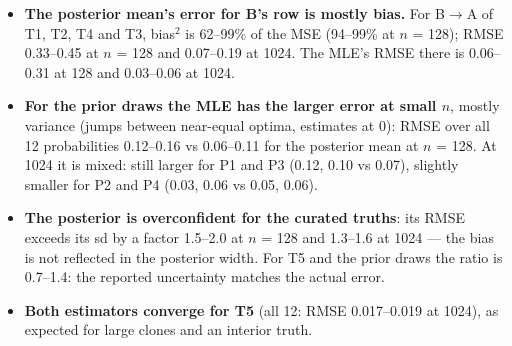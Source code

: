\documentclass[10pt,a4paper]{article}
\newcommand{\BA}{B$\to$A}
\begin{document}
\begin{itemize}
\item \textbf{The posterior mean's error for B's row is mostly bias.} For \BA{} of T1, T2, T4 and T3, bias$^2$ is 62--99\% of the MSE (94--99\% at $n$ = 128); RMSE 0.33--0.45 at $n$ = 128 and 0.07--0.19 at 1024. The MLE's RMSE there is 0.06--0.31 at 128 and 0.03--0.06 at 1024.
\item \textbf{For the prior draws the MLE has the larger error at small $n$}, mostly variance (jumps between near-equal optima, estimates at 0): RMSE over all 12 probabilities 0.12--0.16 vs 0.06--0.11 for the posterior mean at $n$ = 128. At 1024 it is mixed: still larger for P1 and P3 (0.12, 0.10 vs 0.07), slightly smaller for P2 and P4 (0.03, 0.06 vs 0.05, 0.06).
\item \textbf{The posterior is overconfident for the curated truths}: its RMSE exceeds its sd by a factor 1.5--2.0 at $n$ = 128 and 1.3--1.6 at 1024 --- the bias is not reflected in the posterior width. For T5 and the prior draws the ratio is 0.7--1.4: the reported uncertainty matches the actual error.
\item \textbf{Both estimators converge for T5} (all 12: RMSE 0.017--0.019 at 1024), as expected for large clones and an interior truth.
\end{itemize}

\end{document}
